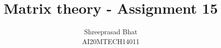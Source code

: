 \documentclass[journal,12pt,twocolumn]{IEEEtran}
\begin{document}
\makeatletter
{}
\makeatother
\let\StandardTheFigure\thefigure
\let\vec\mathbf
\renewcommand{\thefigure}{\theproblem}
\def\putbox#1#2#3{\makebox[0in][l]{\makebox[#1][l]{}\raisebox{\baselineskip}[0in][0in]{\raisebox{#2}[0in][0in]{#3}}}}
     \def\rightbox#1{\makebox[0in][r]{#1}}
     \def\centbox#1{\makebox[0in]{#1}}
     \def\topbox#1{\raisebox{-\baselineskip}[0in][0in]{#1}}
     \def\midbox#1{\raisebox{-0.5\baselineskip}[0in][0in]{#1}}
\vspace{3cm}
\title{Matrix theory - Assignment 15}
\author{Shreeprasad Bhat\\AI20MTECH14011}
%
%
%
% 
%
\end{document}
